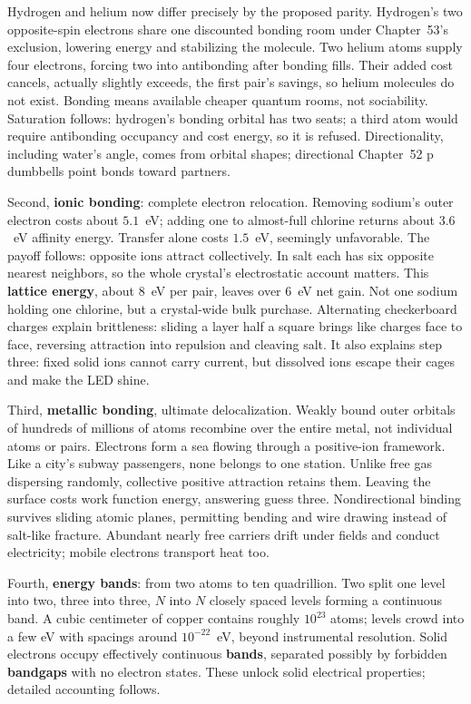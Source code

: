 Hydrogen and helium now differ precisely by the proposed parity. Hydrogen's two opposite-spin electrons share one discounted bonding room under Chapter~53's exclusion, lowering energy and stabilizing the molecule. Two helium atoms supply four electrons, forcing two into antibonding after bonding fills. Their added cost cancels, actually slightly exceeds, the first pair's savings, so helium molecules do not exist. Bonding means available cheaper quantum rooms, not sociability. Saturation follows: hydrogen's bonding orbital has two seats; a third atom would require antibonding occupancy and cost energy, so it is refused. Directionality, including water's angle, comes from orbital shapes; directional Chapter~52 p dumbbells point bonds toward partners.

Second, \textbf{ionic bonding}: complete electron relocation. Removing sodium's outer electron costs about \(5.1\)~eV; adding one to almost-full chlorine returns about \(3.6\)~eV affinity energy. Transfer alone costs \(1.5\)~eV, seemingly unfavorable. The payoff follows: opposite ions attract collectively. In salt each has six opposite nearest neighbors, so the whole crystal's electrostatic account matters. This \textbf{lattice energy}, about \(8\)~eV per pair, leaves over \(6\)~eV net gain. Not one sodium holding one chlorine, but a crystal-wide bulk purchase. Alternating checkerboard charges explain brittleness: sliding a layer half a square brings like charges face to face, reversing attraction into repulsion and cleaving salt. It also explains step three: fixed solid ions cannot carry current, but dissolved ions escape their cages and make the LED shine.

Third, \textbf{metallic bonding}, ultimate delocalization. Weakly bound outer orbitals of hundreds of millions of atoms recombine over the entire metal, not individual atoms or pairs. Electrons form a sea flowing through a positive-ion framework. Like a city's subway passengers, none belongs to one station. Unlike free gas dispersing randomly, collective positive attraction retains them. Leaving the surface costs work function energy, answering guess three. Nondirectional binding survives sliding atomic planes, permitting bending and wire drawing instead of salt-like fracture. Abundant nearly free carriers drift under fields and conduct electricity; mobile electrons transport heat too.

Fourth, \textbf{energy bands}: from two atoms to ten quadrillion. Two split one level into two, three into three, \(N\) into \(N\) closely spaced levels forming a continuous band. A cubic centimeter of copper contains roughly \(10^{23}\) atoms; levels crowd into a few eV with spacings around \(10^{-22}\)~eV, beyond instrumental resolution. Solid electrons occupy effectively continuous \textbf{bands}, separated possibly by forbidden \textbf{bandgaps} with no electron states. These unlock solid electrical properties; detailed accounting follows.

